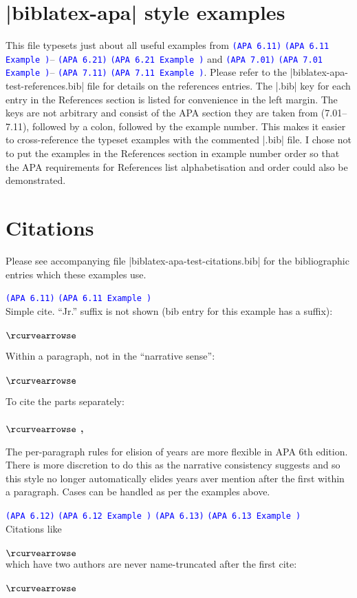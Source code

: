 \documentclass{article}
\newcommand\apa[2][]{\ifthenelse{\equal{#1}{}}%
                       {\textcolor{blue}{\texttt{(APA #2)}}}%
                       {\textcolor{blue}{\texttt{(APA #2 Example #1)}}}}
\def\apaex#1{\hbox{\hspace{-4em}\texttt{\small \detokenize{#1}}}\\ $\rcurvearrowse$ \textbf{#1}}
\begin{document}
\section*{|biblatex-apa| style examples}

This file typesets just about all useful examples from
\apa{6.11}--\apa{6.21} and \apa{7.01}--\apa{7.11}. Please refer to the
|biblatex-apa-test-references.bib| file for details on the references
entries. The |.bib| key for each entry in the References section is listed
for convenience in the left margin. The keys are not arbitrary and consist
of the APA section they are taken from (7.01--7.11), followed by a colon,
followed by the example number. This makes it easier to cross-reference
the typeset examples with the commented |.bib| file. I chose not to put the
examples in the References section in example number order so that the APA
requirements for References list alphabetisation and order could also be
demonstrated.

\section*{Citations}

\noindent Please see accompanying file |biblatex-apa-test-citations.bib|
for the bibliographic entries which these examples use.

\noindent\apa{6.11}\\
Simple cite. ``Jr.'' suffix is not shown (bib entry for this example has a suffix):\\
\apaex{\textcite{6.11}}

\noindent Within a paragraph, not in the ``narrative sense'':\\
\apaex{\parencite{6.11}}

\noindent To cite the parts separately:\\
\apaex{\citeyear{6.11}, \citeauthor{6.11}}

\noindent The per-paragraph rules for elision of years are more flexible in
APA 6th edition. There is more discretion to do this as the narrative
consistency suggests and so this style no longer automatically elides years
aver mention after the first within a paragraph. Cases can be handled as
per the examples above.

\noindent\apa{6.12} \apa{6.13}\\
Citations like\\
\apaex{\textcite{6.12a}}\\
which have two authors are never name-truncated after the first cite:\\
\apaex{\textcite{6.12a}}
\end{document}
